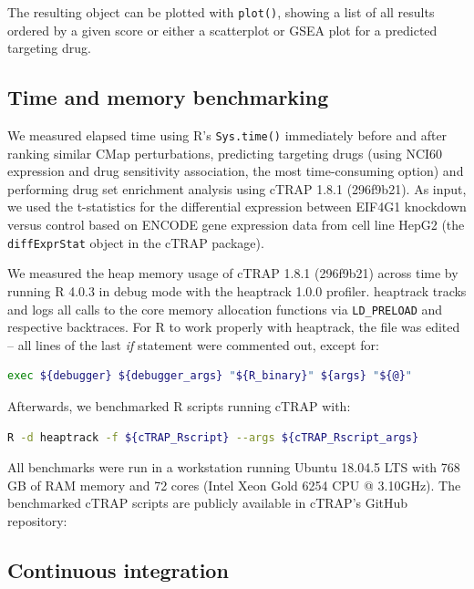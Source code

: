 The resulting object can be plotted with \texttt{plot()}, showing a list of all results ordered by a given score or either a scatterplot or GSEA plot for a predicted targeting drug.

\subsection{Time and memory benchmarking}

We measured elapsed time using R’s \texttt{Sys.time()} immediately before and after ranking similar CMap perturbations, predicting targeting drugs (using NCI60 expression and drug sensitivity association, the most time-consuming option) and performing drug set enrichment analysis using cTRAP 1.8.1 (296f9b21). As input, we used the t-statistics for the differential expression between EIF4G1 knockdown versus control based on ENCODE gene expression data from cell line HepG2 (the \texttt{diffExprStat} object in the cTRAP package).

We measured the heap memory usage of cTRAP 1.8.1 (296f9b21) across time by running R 4.0.3 in debug mode with the heaptrack 1.0.0 profiler. heaptrack tracks and logs all calls to the core memory allocation functions via \verb|LD_PRELOAD| and respective backtraces. For R to work properly with heaptrack, the file  was edited -- all lines of the last \emph{if} statement were commented out, except for:

\begin{lstlisting}[language=bash,numbers=none]
exec ${debugger} ${debugger_args} "${R_binary}" ${args} "${@}"
\end{lstlisting}

Afterwards, we benchmarked R scripts running cTRAP with:

\begin{lstlisting}[language=bash,numbers=none]
R -d heaptrack -f ${cTRAP_Rscript} --args ${cTRAP_Rscript_args}
\end{lstlisting}

All benchmarks were run in a workstation running Ubuntu 18.04.5 LTS with 768 GB of RAM memory and 72 cores (Intel Xeon Gold 6254 CPU @ 3.10GHz). The benchmarked cTRAP scripts are publicly available in cTRAP's GitHub repository: 

\subsection{Continuous integration}

